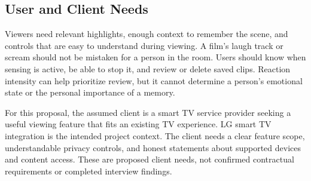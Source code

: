\subsection{User and Client Needs}

Viewers need relevant highlights, enough context to remember the scene, and controls that are easy to understand during viewing. A film's laugh track or scream should not be mistaken for a person in the room. Users should know when sensing is active, be able to stop it, and review or delete saved clips. Reaction intensity can help prioritize review, but it cannot determine a person's emotional state or the personal importance of a memory.

For this proposal, the assumed client is a smart TV service provider seeking a useful viewing feature that fits an existing TV experience. LG smart TV integration is the intended project context. The client needs a clear feature scope, understandable privacy controls, and honest statements about supported devices and content access. These are proposed client needs, not confirmed contractual requirements or completed interview findings.
